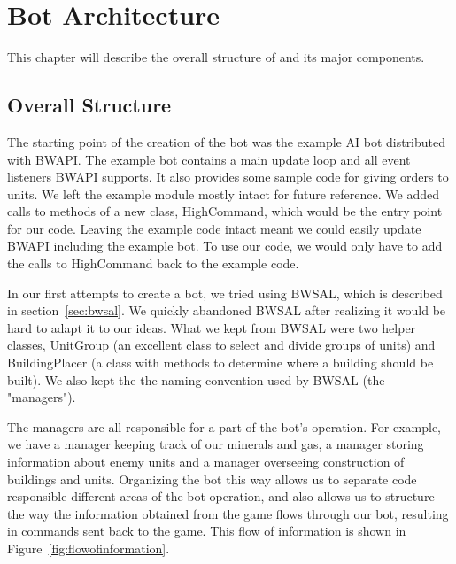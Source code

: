 
\chapter{Bot Architecture}
\label{chap:implementation}

This chapter will describe the overall structure of \massexpand and its major components.

\section{Overall Structure}

The starting point of the creation of the bot was the example AI bot distributed with BWAPI. The example bot contains a main update loop and all event listeners BWAPI supports. It also provides some sample code for giving orders to units. We left the example module mostly intact for future reference. We added calls to methods of a new class, HighCommand, which would be the entry point for our code. Leaving the example code intact meant we could easily update BWAPI including the example bot. To use our code, we would only have to add the calls to HighCommand back to the example code.

In our first attempts to create a bot, we tried using BWSAL, which is described in section~\ref{sec:bwsal}. We quickly abandoned BWSAL after realizing it would be hard to adapt it to our ideas. What we kept from BWSAL were two helper classes, UnitGroup (an excellent class to select and divide groups of units) and BuildingPlacer (a class with methods to determine where a building should be built). We also kept the the naming convention used by BWSAL (the "managers").

The managers are all responsible for a part of the bot's operation. For example, we have a manager keeping track of our minerals and gas, a manager storing information about enemy units and a manager overseeing construction of buildings and units. Organizing the bot this way allows us to separate code responsible different areas of the bot operation, and also allows us to structure the way the information obtained from the game flows through our bot, resulting in commands sent back to the game. This flow of information is shown in Figure~\ref{fig:flowofinformation}.

